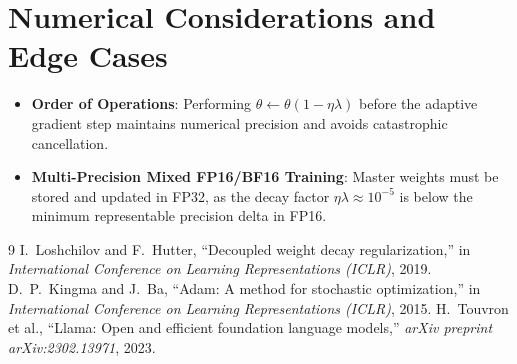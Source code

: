 \documentclass[11pt,a4paper]{article}
\theoremstyle{definition}
\begin{document}
\section{Numerical Considerations and Edge Cases}

\begin{itemize}
    \item \textbf{Order of Operations}: Performing $\theta \leftarrow \theta(1 - \eta \lambda)$ before the adaptive gradient step maintains numerical precision and avoids catastrophic cancellation.
    \item \textbf{Multi-Precision Mixed FP16/BF16 Training}: Master weights must be stored and updated in FP32, as the decay factor $\eta \lambda \approx 10^{-5}$ is below the minimum representable precision delta in FP16.
\end{itemize}

\begin{thebibliography}{9}
 I.~Loshchilov and F.~Hutter, ``Decoupled weight decay regularization,'' in \emph{International Conference on Learning Representations (ICLR)}, 2019.
 D.~P.~Kingma and J.~Ba, ``Adam: A method for stochastic optimization,'' in \emph{International Conference on Learning Representations (ICLR)}, 2015.
 H.~Touvron et al., ``Llama: Open and efficient foundation language models,'' \emph{arXiv preprint arXiv:2302.13971}, 2023.
\end{thebibliography}
\end{document}
